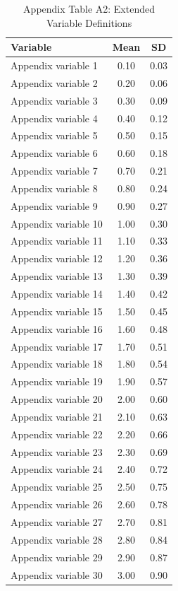 \documentclass{article}
\begin{document}
\begin{longtable}{lcc}
\caption{Appendix Table A2: Extended Variable Definitions}\\
\toprule
Variable & Mean & SD \\
\midrule
Appendix variable 1 & 0.10 & 0.03 \\
Appendix variable 2 & 0.20 & 0.06 \\
Appendix variable 3 & 0.30 & 0.09 \\
Appendix variable 4 & 0.40 & 0.12 \\
Appendix variable 5 & 0.50 & 0.15 \\
Appendix variable 6 & 0.60 & 0.18 \\
Appendix variable 7 & 0.70 & 0.21 \\
Appendix variable 8 & 0.80 & 0.24 \\
Appendix variable 9 & 0.90 & 0.27 \\
Appendix variable 10 & 1.00 & 0.30 \\
Appendix variable 11 & 1.10 & 0.33 \\
Appendix variable 12 & 1.20 & 0.36 \\
Appendix variable 13 & 1.30 & 0.39 \\
Appendix variable 14 & 1.40 & 0.42 \\
Appendix variable 15 & 1.50 & 0.45 \\
Appendix variable 16 & 1.60 & 0.48 \\
Appendix variable 17 & 1.70 & 0.51 \\
Appendix variable 18 & 1.80 & 0.54 \\
Appendix variable 19 & 1.90 & 0.57 \\
Appendix variable 20 & 2.00 & 0.60 \\
Appendix variable 21 & 2.10 & 0.63 \\
Appendix variable 22 & 2.20 & 0.66 \\
Appendix variable 23 & 2.30 & 0.69 \\
Appendix variable 24 & 2.40 & 0.72 \\
Appendix variable 25 & 2.50 & 0.75 \\
Appendix variable 26 & 2.60 & 0.78 \\
Appendix variable 27 & 2.70 & 0.81 \\
Appendix variable 28 & 2.80 & 0.84 \\
Appendix variable 29 & 2.90 & 0.87 \\
Appendix variable 30 & 3.00 & 0.90 \\
\bottomrule
\end{longtable}
\end{document}
